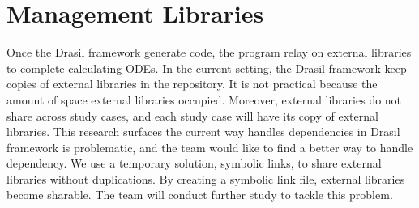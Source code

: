 \section{Management Libraries}
Once the Drasil framework generate code, the program relay on external libraries to complete calculating ODEs. In the current setting, the Drasil framework keep copies of external libraries in the repository. It is not practical because the amount of space external libraries occupied. Moreover, external libraries do not share across study cases, and each study case will have its copy of external libraries. This research surfaces the current way handles dependencies in Drasil framework is problematic, and the team would like to find a better way to handle dependency. We use a temporary solution, symbolic links, to share external libraries without duplications. By creating a symbolic link file, external libraries become sharable. The team will conduct further study to tackle this problem.
